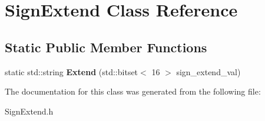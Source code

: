 \hypertarget{class_sign_extend}{}\section{Sign\+Extend Class Reference}
\label{class_sign_extend}
\subsection*{Static Public Member Functions}
\begin{DoxyCompactItemize}
\item 
\mbox{\label{class_sign_extend_a0636bbd05631fc9d73012bd6d78107ea}} 
static std\+::string {\bfseries Extend} (std\+::bitset$<$ 16 $>$ sign\+\_\+extend\+\_\+val)
\end{DoxyCompactItemize}


The documentation for this class was generated from the following file\+:\begin{DoxyCompactItemize}
\item 
Sign\+Extend.\+h\end{DoxyCompactItemize}
